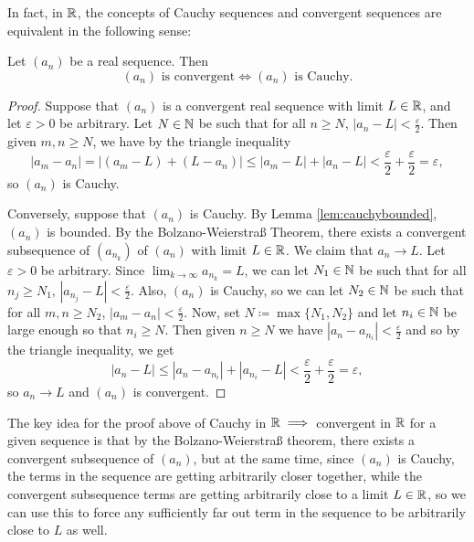 \documentclass[../analysis1.tex]{subfiles}
\begin{document}
In fact, in $\mathbb{R}$, the concepts of Cauchy sequences and convergent sequences are equivalent in the following sense:
\begin{theorem}
\label{thm:cauchycriterionR}
    \begin{shaded*}
        Let $(a_n)$ be a real sequence. Then $$(a_n)\text{ is convergent}\iff (a_n)\text{ is Cauchy}.$$
    \end{shaded*}
\end{theorem}
\begin{proof}
    Suppose that $(a_n)$ is a convergent real sequence with limit $L\in\mathbb{R}$, and let $\varepsilon>0$ be arbitrary. Let $N\in\mathbb{N}$ be such that for all $n\ge N$, $|a_n-L|<\frac{\varepsilon}{2}$. Then given $m,n\ge N$, we have by the triangle inequality $$|a_m-a_n|=|(a_m-L)+(L-a_n)|\le |a_m-L|+|a_n-L|<\frac{\varepsilon}{2}+\frac{\varepsilon}{2}=\varepsilon,$$so $(a_n)$ is Cauchy.\par
    Conversely, suppose that $(a_n)$ is Cauchy. By Lemma \ref{lem:cauchybounded}, $(a_n)$ is bounded. By the Bolzano-Weierstraß Theorem, there exists a convergent subsequence of $(a_{n_k})$ of $(a_n)$ with limit $L\in\mathbb{R}$. We claim that $a_n\to L$. Let $\varepsilon>0$ be arbitrary. Since $\lim_{k\to\infty}a_{n_k}=L$, we can let $N_1\in\mathbb{N}$ be such that for all $n_j\ge N_1$, $|a_{n_j}-L|<\frac{\varepsilon}{2}$. Also, $(a_n)$ is Cauchy, so we can let $N_2\in\mathbb{N}$ be such that for all $m,n\ge N_2$, $|a_m-a_n|<\frac{\varepsilon}{2}$. Now, set $N\coloneqq\max\{N_1,N_2\}$ and let $n_i\in\mathbb{N}$ be large enough so that $n_i\ge N$. Then given $n\ge N$ we have $|a_n-a_{n_i}|<\frac{\varepsilon}{2}$ and so by the triangle inequality, we get $$|a_n-L|\le |a_n-a_{n_i}|+|a_{n_i}-L|<\frac{\varepsilon}{2}+\frac{\varepsilon}{2}=\varepsilon,$$so $a_n\to L$ and $(a_n)$ is convergent.\qedhere
\end{proof}
The key idea for the proof above of Cauchy in $\mathbb{R}\implies$ convergent in $\mathbb{R}$ for a given sequence is that by the Bolzano-Weierstraß theorem, there exists a convergent subsequence of $(a_n)$, but at the same time, since $(a_n)$ is Cauchy, the terms in the sequence are getting arbitrarily closer together, while the convergent subsequence terms are getting arbitrarily close to a limit $L\in\mathbb{R}$, so we can use this to force any sufficiently far out term in the sequence to be arbitrarily close to $L$ as well.
\end{document}
